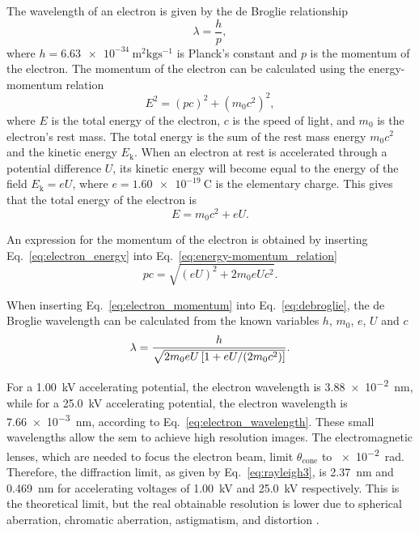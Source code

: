 The wavelength of an electron is given by the de Broglie relationship \citep{de1924recherches}
\begin{equation}
\label{eq:debroglie}
\lambda = \frac{h}{p},
\end{equation}
where $h=\SI{6.63e-34}{\metre^2\kilo\gram\second^{-1}}$ is Planck's constant and $p$ is the momentum of the electron. The momentum of the electron can be calculated using the energy-momentum relation
\begin{equation}
\label{eq:energy-momentum_relation}
E^2 = (pc)^2 + (m_0c^2)^2,
\end{equation}
where $E$ is the total energy of the electron, $c$ is the speed of light, and $m_0$ is the electron's rest mass. The total energy is the sum of the rest mass energy $m_0c^2$ and the kinetic energy $E_\mathrm{k}$. When an electron at rest is accelerated through a potential difference $U$, its kinetic energy will become equal to the energy of the field $E_\textrm{k} = e U$, where $e=\SI{1.60e-19}{\coulomb}$ is the elementary charge. This gives that the total energy of the electron is
\begin{equation}
\label{eq:electron_energy}
E = m_0c^2 + eU.
\end{equation}

An expression for the momentum of the electron is obtained by inserting Eq.~\eqref{eq:electron_energy} into Eq.~\eqref{eq:energy-momentum_relation}
\begin{equation}
\label{eq:electron_momentum}
pc = \sqrt{(eU)^2 + 2m_0eUc^2}.
\end{equation}

When inserting Eq.~\ref{eq:electron_momentum} into Eq.~\ref{eq:debroglie}, the de Broglie wavelength can be calculated from the known variables $h$, $m_0$, $e$, $U$ and $c$
\begin{equation}
\label{eq:electron_wavelength}
\lambda = \frac{h}{\sqrt{2m_0eU\left[ 1 + eU/(2m_0c^2) \right]}}.
\end{equation}

For a \SI{1.00}{\kilo\volt} accelerating potential, the electron wavelength is \SI{3.88e-2}{\nano\metre}, while for a \SI{25.0}{\kilo\volt} accelerating potential, the electron wavelength is \SI{7.66e-3}{\nano\metre}, according to Eq.~\ref{eq:electron_wavelength}. These small wavelengths allow the \ac{sem} to achieve high resolution images. The electromagnetic lenses, which are needed to focus the electron beam, limit $\theta_\text{cone}$ to \SI{e-2}{\radian}. Therefore, the diffraction limit, as given by Eq.~\eqref{eq:rayleigh3}, is \SI{2.37}{\nano\metre} and \SI{0.469}{\nano\metre} for accelerating voltages of \SI{1.00}{\kilo\volt} and \SI{25.0}{\kilo\volt} respectively. This is the theoretical limit, but the real obtainable resolution is lower due to spherical aberration, chromatic aberration, astigmatism, and distortion \citep{brandon2013microstructural}.

